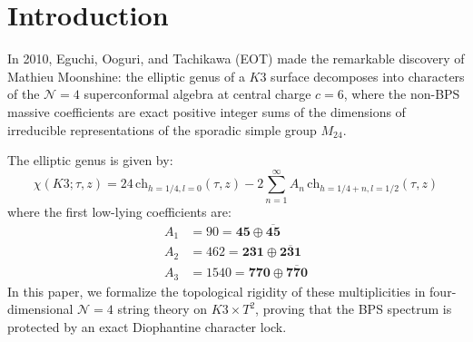 \documentclass[11pt,a4paper]{article}
\begin{document}
\section{Introduction}
In 2010, Eguchi, Ooguri, and Tachikawa (EOT) made the remarkable discovery of Mathieu Moonshine: the elliptic genus of a $K3$ surface decomposes into characters of the $\mathcal{N}=4$ superconformal algebra at central charge $c=6$, where the non-BPS massive coefficients are exact positive integer sums of the dimensions of irreducible representations of the sporadic simple group $M_{24}$.

The elliptic genus is given by:
\begin{equation}
    \chi(K3; \tau, z) = 24 \, \mathrm{ch}_{h=1/4, l=0}(\tau, z) - 2 \sum_{n=1}^\infty A_n \, \mathrm{ch}_{h=1/4+n, l=1/2}(\tau, z)
\end{equation}
where the first low-lying coefficients are:
\begin{align}
    A_1 &= 90 = \mathbf{45} \oplus \overline{\mathbf{45}} \\
    A_2 &= 462 = \mathbf{231} \oplus \overline{\mathbf{231}} \\
    A_3 &= 1540 = \mathbf{770} \oplus \overline{\mathbf{770}}
\end{align}
In this paper, we formalize the topological rigidity of these multiplicities in four-dimensional $\mathcal{N}=4$ string theory on $K3 \times T^2$, proving that the BPS spectrum is protected by an exact Diophantine character lock.
\end{document}
